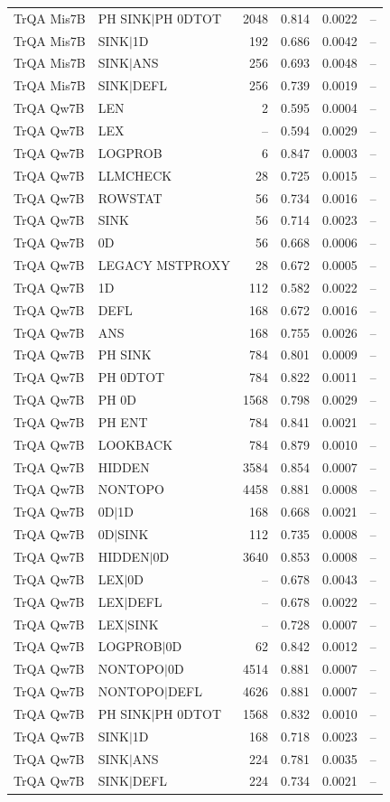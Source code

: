 \begin{longtable}{llrrrr}
TrQA Mis7B & PH SINK$\mid$PH 0DTOT & 2048 & 0.814 & 0.0022 & -- \\
TrQA Mis7B & SINK$\mid$1D & 192 & 0.686 & 0.0042 & -- \\
TrQA Mis7B & SINK$\mid$ANS & 256 & 0.693 & 0.0048 & -- \\
TrQA Mis7B & SINK$\mid$DEFL & 256 & 0.739 & 0.0019 & -- \\
TrQA Qw7B & LEN & 2 & 0.595 & 0.0004 & -- \\
TrQA Qw7B & LEX & -- & 0.594 & 0.0029 & -- \\
TrQA Qw7B & LOGPROB & 6 & 0.847 & 0.0003 & -- \\
TrQA Qw7B & LLMCHECK & 28 & 0.725 & 0.0015 & -- \\
TrQA Qw7B & ROWSTAT & 56 & 0.734 & 0.0016 & -- \\
TrQA Qw7B & SINK & 56 & 0.714 & 0.0023 & -- \\
TrQA Qw7B & 0D & 56 & 0.668 & 0.0006 & -- \\
TrQA Qw7B & LEGACY MSTPROXY & 28 & 0.672 & 0.0005 & -- \\
TrQA Qw7B & 1D & 112 & 0.582 & 0.0022 & -- \\
TrQA Qw7B & DEFL & 168 & 0.672 & 0.0016 & -- \\
TrQA Qw7B & ANS & 168 & 0.755 & 0.0026 & -- \\
TrQA Qw7B & PH SINK & 784 & 0.801 & 0.0009 & -- \\
TrQA Qw7B & PH 0DTOT & 784 & 0.822 & 0.0011 & -- \\
TrQA Qw7B & PH 0D & 1568 & 0.798 & 0.0029 & -- \\
TrQA Qw7B & PH ENT & 784 & 0.841 & 0.0021 & -- \\
TrQA Qw7B & LOOKBACK & 784 & 0.879 & 0.0010 & -- \\
TrQA Qw7B & HIDDEN & 3584 & 0.854 & 0.0007 & -- \\
TrQA Qw7B & NONTOPO & 4458 & 0.881 & 0.0008 & -- \\
TrQA Qw7B & 0D$\mid$1D & 168 & 0.668 & 0.0021 & -- \\
TrQA Qw7B & 0D$\mid$SINK & 112 & 0.735 & 0.0008 & -- \\
TrQA Qw7B & HIDDEN$\mid$0D & 3640 & 0.853 & 0.0008 & -- \\
TrQA Qw7B & LEX$\mid$0D & -- & 0.678 & 0.0043 & -- \\
TrQA Qw7B & LEX$\mid$DEFL & -- & 0.678 & 0.0022 & -- \\
TrQA Qw7B & LEX$\mid$SINK & -- & 0.728 & 0.0007 & -- \\
TrQA Qw7B & LOGPROB$\mid$0D & 62 & 0.842 & 0.0012 & -- \\
TrQA Qw7B & NONTOPO$\mid$0D & 4514 & 0.881 & 0.0007 & -- \\
TrQA Qw7B & NONTOPO$\mid$DEFL & 4626 & 0.881 & 0.0007 & -- \\
TrQA Qw7B & PH SINK$\mid$PH 0DTOT & 1568 & 0.832 & 0.0010 & -- \\
TrQA Qw7B & SINK$\mid$1D & 168 & 0.718 & 0.0023 & -- \\
TrQA Qw7B & SINK$\mid$ANS & 224 & 0.781 & 0.0035 & -- \\
TrQA Qw7B & SINK$\mid$DEFL & 224 & 0.734 & 0.0021 & -- \\
\bottomrule
\end{longtable}
